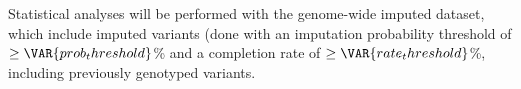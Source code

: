 
Statistical analyses will be performed with the genome-wide imputed dataset,
which include  imputed variants (done with an imputation
probability threshold of $\geq\VAR{ prob_threshold }$\% and a completion rate
of $\geq\VAR{ rate_threshold }$\%, including  previously
genotyped variants.

